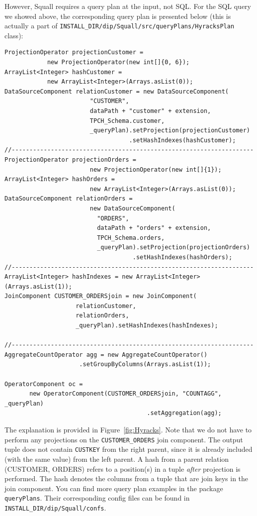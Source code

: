 \documentclass[a4paper,10pt]{article}
\begin{document}
However, Squall requires a query plan at the input, not SQL. For the SQL query we showed above, the corresponding query plan is presented below (this is actually a part of \verb#INSTALL_DIR/dip/Squall/src/queryPlans/HyracksPlan# class):
\begin{verbatim}
ProjectionOperator projectionCustomer = 
			new ProjectionOperator(new int[]{0, 6});
ArrayList<Integer> hashCustomer = 
			new ArrayList<Integer>(Arrays.asList(0));
DataSourceComponent relationCustomer = new DataSourceComponent(
                        "CUSTOMER",
                        dataPath + "customer" + extension,
                        TPCH_Schema.customer,
                        _queryPlan).setProjection(projectionCustomer)
                                   .setHashIndexes(hashCustomer);
//--------------------------------------------------------------------
ProjectionOperator projectionOrders = 
                        new ProjectionOperator(new int[]{1});
ArrayList<Integer> hashOrders = 
                        new ArrayList<Integer>(Arrays.asList(0));
DataSourceComponent relationOrders = 
                        new DataSourceComponent(
                          "ORDERS",
                          dataPath + "orders" + extension,
                          TPCH_Schema.orders,
                          _queryPlan).setProjection(projectionOrders)
                                    .setHashIndexes(hashOrders);                             
//--------------------------------------------------------------------
ArrayList<Integer> hashIndexes = new ArrayList<Integer>(Arrays.asList(1));
JoinComponent CUSTOMER_ORDERSjoin = new JoinComponent(
                    relationCustomer,
                    relationOrders,
                    _queryPlan).setHashIndexes(hashIndexes);

//--------------------------------------------------------------------
AggregateCountOperator agg = new AggregateCountOperator()
			         .setGroupByColumns(Arrays.asList(1));

OperatorComponent oc = 
       new OperatorComponent(CUSTOMER_ORDERSjoin, "COUNTAGG", _queryPlan)
                                        .setAggregation(agg);
\end{verbatim}

The explanation is provided in Figure~\ref{fig:Hyracks}. Note that we do not have to perform any projections on the \verb#CUSTOMER_ORDERS# join component. The output tuple does not contain \verb#CUSTKEY# from the right parent, since it is already included (with the same value) from the left parent. A hash from a parent relation (CUSTOMER, ORDERS) refers to a position(s) in a tuple \textit{after} projection is performed. The hash denotes the columns from a tuple that are join keys in the join component. You can find more query plan examples in the package \verb#queryPlans#. Their corresponding config files can be found in \verb#INSTALL_DIR/dip/Squall/confs#.
\end{document}
